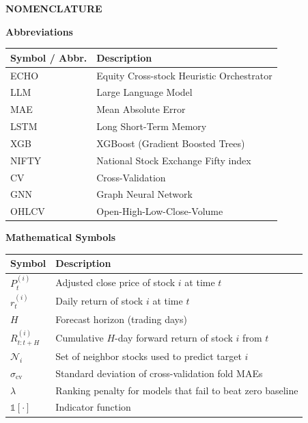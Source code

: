 \documentclass[12pt,a4paper,titlepage]{article}
\begin{document}
\begin{titlepage}
    \centering
    
    {\Large\bfseries NOMENCLATURE\par}
    
    \vspace{1.2cm}
    
    \begin{minipage}{0.9\textwidth}
        \setlength{\parindent}{0pt}
        \setlength{\parskip}{0.4em}
        \normalsize
        
        \textbf{Abbreviations}
        
        \begin{tabular}{p{} p{}}
            \toprule
            \textbf{Symbol / Abbr.} & \textbf{Description} \\
            \midrule
            ECHO   & Equity Cross-stock Heuristic Orchestrator \\
            LLM    & Large Language Model \\
            MAE    & Mean Absolute Error \\
            LSTM   & Long Short-Term Memory \\
            XGB    & XGBoost (Gradient Boosted Trees) \\
            NIFTY  & National Stock Exchange Fifty index \\
            CV     & Cross-Validation \\
            GNN    & Graph Neural Network \\
            OHLCV  & Open-High-Low-Close-Volume \\
            \bottomrule
        \end{tabular}
        
        \vspace{0.8cm}
        
        \textbf{Mathematical Symbols}
        
        \begin{tabular}{p{} p{}}
            \toprule
            \textbf{Symbol} & \textbf{Description} \\
            \midrule
            $P_t^{(i)}$  & Adjusted close price of stock $i$ at time $t$ \\
            $r_t^{(i)}$  & Daily return of stock $i$ at time $t$ \\
            $H$          & Forecast horizon (trading days) \\
            $R_{t:t+H}^{(i)}$ & Cumulative $H$-day forward return of stock $i$ from $t$ \\
            $\mathcal{N}_i$ & Set of neighbor stocks used to predict target $i$ \\
            $\sigma_{\text{cv}}$ & Standard deviation of cross-validation fold MAEs \\
            $\lambda$     & Ranking penalty for models that fail to beat zero baseline \\
            $\mathbb{1}[\cdot]$ & Indicator function \\
            \bottomrule
        \end{tabular}
        

\end{minipage}
\end{titlepage}
\end{document}
